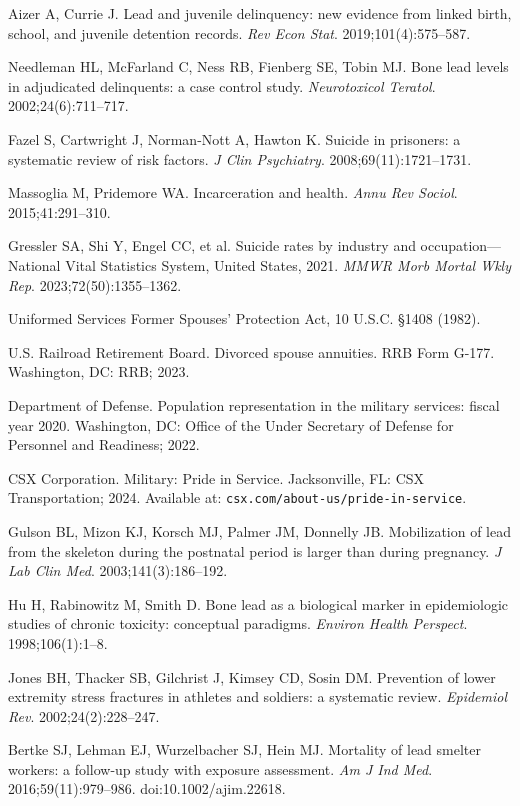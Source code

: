 \documentclass[11pt,twocolumn]{article}
\begin{document}
{\begin{enumerate}[label={[\arabic*]}, leftmargin=*, itemsep=1pt]
    \item Aizer A, Currie J. Lead and juvenile delinquency: new evidence from linked birth, school, and juvenile detention records. \textit{Rev Econ Stat}. 2019;101(4):575--587.
    \item Needleman HL, McFarland C, Ness RB, Fienberg SE, Tobin MJ. Bone lead levels in adjudicated delinquents: a case control study. \textit{Neurotoxicol Teratol}. 2002;24(6):711--717.
    \item Fazel S, Cartwright J, Norman-Nott A, Hawton K. Suicide in prisoners: a systematic review of risk factors. \textit{J Clin Psychiatry}. 2008;69(11):1721--1731.
    \item Massoglia M, Pridemore WA. Incarceration and health. \textit{Annu Rev Sociol}. 2015;41:291--310.
    \item Gressler SA, Shi Y, Engel CC, et al. Suicide rates by industry and occupation---National Vital Statistics System, United States, 2021. \textit{MMWR Morb Mortal Wkly Rep}. 2023;72(50):1355--1362.
    \item Uniformed Services Former Spouses' Protection Act, 10 U.S.C. \S 1408 (1982).
    \item U.S. Railroad Retirement Board. Divorced spouse annuities. RRB Form G-177. Washington, DC: RRB; 2023.
    \item Department of Defense. Population representation in the military services: fiscal year 2020. Washington, DC: Office of the Under Secretary of Defense for Personnel and Readiness; 2022.
    \item CSX Corporation. Military: Pride in Service. Jacksonville, FL: CSX Transportation; 2024. Available at: \texttt{csx.com/about-us/pride-in-service}.
    \item Gulson BL, Mizon KJ, Korsch MJ, Palmer JM, Donnelly JB. Mobilization of lead from the skeleton during the postnatal period is larger than during pregnancy. \textit{J Lab Clin Med}. 2003;141(3):186--192.
    \item Hu H, Rabinowitz M, Smith D. Bone lead as a biological marker in epidemiologic studies of chronic toxicity: conceptual paradigms. \textit{Environ Health Perspect}. 1998;106(1):1--8.
    \item Jones BH, Thacker SB, Gilchrist J, Kimsey CD, Sosin DM. Prevention of lower extremity stress fractures in athletes and soldiers: a systematic review. \textit{Epidemiol Rev}. 2002;24(2):228--247.
    \item Bertke SJ, Lehman EJ, Wurzelbacher SJ, Hein MJ. Mortality of lead smelter workers: a follow-up study with exposure assessment. \textit{Am J Ind Med}. 2016;59(11):979--986. doi:10.1002/ajim.22618.

\end{enumerate}}
\end{document}
